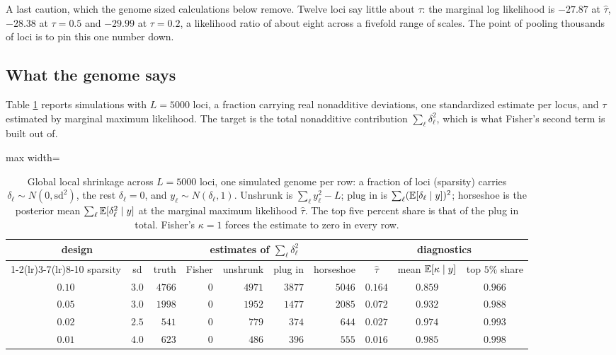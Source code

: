 \begin{example}
A last caution, which the genome sized calculations below remove. Twelve loci say little about
$\tau$: the marginal log likelihood is $-27.87$ at $\hat\tau$, $-28.38$ at $\tau=0.5$ and $-29.99$
at $\tau=0.2$, a likelihood ratio of about eight across a fivefold range of scales. The point of
pooling thousands of loci is to pin this one number down.
\end{example}

\subsection{What the genome says}

Table \ref{ftns:tab:hs} reports simulations with $L=5000$ loci, a fraction carrying real nonadditive
deviations, one standardized estimate per locus, and $\tau$ estimated by marginal maximum
likelihood. The target is the total nonadditive contribution $\sum_\ell\delta_\ell^2$, which is
what Fisher's second term is built out of.

\begin{table}[t]
\centering
\begin{adjustbox}{max width=\textwidth}
\begin{tabular}{ccrrrrrccc}
\toprule
\multicolumn{2}{c}{design} & \multicolumn{5}{c}{estimates of $\sum_\ell\delta^2_\ell$} &
\multicolumn{3}{c}{diagnostics} \\
\cmidrule(lr){1-2}\cmidrule(lr){3-7}\cmidrule(lr){8-10}
sparsity & sd & truth & Fisher & unshrunk & plug in & horseshoe & $\hat\tau$ &
mean $\mathbb{E}[\kappa\mid y]$ & top $5\%$ share \\
\midrule
$0.10$ & $3.0$ & $4766$ & $0$ & $4971$ & $3877$ & $5046$ & $0.164$ & $0.859$ & $0.966$ \\
$0.05$ & $3.0$ & $1998$ & $0$ & $1952$ & $1477$ & $2085$ & $0.072$ & $0.932$ & $0.988$ \\
$0.02$ & $2.5$ & $\phantom{0}541$ & $0$ & $\phantom{0}779$ & $\phantom{0}374$ & $\phantom{0}644$ & $0.027$ & $0.974$ & $0.993$ \\
$0.01$ & $4.0$ & $\phantom{0}623$ & $0$ & $\phantom{0}486$ & $\phantom{0}396$ & $\phantom{0}555$ & $0.016$ & $0.985$ & $0.998$ \\
\bottomrule
\end{tabular}
\end{adjustbox}
\caption{Global local shrinkage across $L=5000$ loci, one simulated genome per row: a fraction of
loci (sparsity) carries $\delta_\ell\sim N(0,\mathrm{sd}^2)$, the rest $\delta_\ell=0$, and
$y_\ell\sim N(\delta_\ell,1)$. Unshrunk is $\sum_\ell y_\ell^2-L$; plug in is
$\sum_\ell(\mathbb{E}[\delta_\ell\mid y])^2$; horseshoe is the posterior mean
$\sum_\ell\mathbb{E}[\delta_\ell^2\mid y]$ at the marginal maximum likelihood $\hat\tau$. The top five
percent share is that of the plug in total. Fisher's $\kappa=1$ forces the estimate to zero in
every row.}
\label{ftns:tab:hs}
\end{table}

